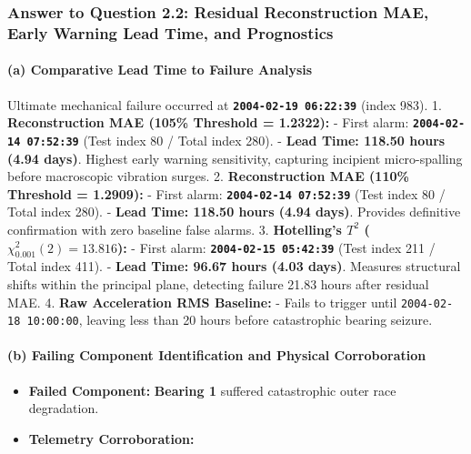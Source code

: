 \begin{tcolorbox}[colback=teal!3!white,colframe=teal!70!black,boxrule=0.7pt,arc=3pt,left=6pt,right=6pt,top=4pt,bottom=4pt,breakable,before upper={\sloppy\raggedright},title=\textbf{\small Notebook Analytical Narrative: Answer to Question 2.2}]
\subsubsection{\texorpdfstring{\textbf{Answer to Question 2.2: Residual Reconstruction MAE, Early Warning Lead Time, and Prognostics}}{Answer to Question 2.2: Residual Reconstruction MAE, Early Warning Lead Time, and Prognostics}}

\paragraph{\texorpdfstring{\textbf{(a) Comparative Lead Time to Failure Analysis}}{(a) Comparative Lead Time to Failure Analysis}}

Ultimate mechanical failure occurred at \textbf{\texttt{2004-02-19\ 06:22:39}} (index 983). 1. \textbf{Reconstruction MAE (105\% Threshold = 1.2322):} - First alarm: \textbf{\texttt{2004-02-14\ 07:52:39}} (Test index 80 / Total index 280). - \textbf{Lead Time: 118.50 hours (4.94 days)}. Highest early warning sensitivity, capturing incipient micro-spalling before macroscopic vibration surges. 2. \textbf{Reconstruction MAE (110\% Threshold = 1.2909):} - First alarm: \textbf{\texttt{2004-02-14\ 07:52:39}} (Test index 80 / Total index 280). - \textbf{Lead Time: 118.50 hours (4.94 days)}. Provides definitive confirmation with zero baseline false alarms. 3. \textbf{Hotelling's \(T^2\) (\(\chi_{0.001}^2(2) = 13.816\)):} - First alarm: \textbf{\texttt{2004-02-15\ 05:42:39}} (Test index 211 / Total index 411). - \textbf{Lead Time: 96.67 hours (4.03 days)}. Measures structural shifts within the principal plane, detecting failure 21.83 hours after residual MAE. 4. \textbf{Raw Acceleration RMS Baseline:} - Fails to trigger until \texttt{2004-02-18\ 10:00:00}, leaving less than 20 hours before catastrophic bearing seizure.

\paragraph{\texorpdfstring{\textbf{(b) Failing Component Identification and Physical Corroboration}}{(b) Failing Component Identification and Physical Corroboration}}

\begin{itemize}
\tightlist
\item
  \textbf{Failed Component:} \textbf{Bearing 1} suffered catastrophic outer race degradation.
\item
  \textbf{Telemetry Corroboration:}


\end{itemize}
\end{tcolorbox}
